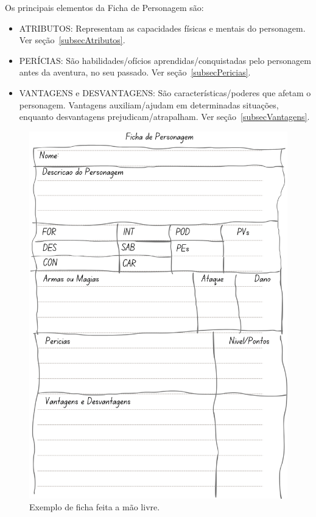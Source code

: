 Os principais elementos da Ficha de Personagem são: 
\begin{itemize}
	\item ATRIBUTOS: Representam as capacidades físicas e mentais do personagem. Ver seção~\ref{subsecAtributos}.
	\item PERÍCIAS: São habilidades/ofícios aprendidas/conquistadas pelo personagem antes da aventura, no seu passado. Ver seção~\ref{subsecPericias}.
	\item VANTAGENS e DESVANTAGENS: São características/poderes que afetam o personagem. Vantagens auxiliam/ajudam em determinadas situações, enquanto desvantagens prejudicam/atrapalham.  Ver seção~\ref{subsecVantagens}.
\end{itemize}

 
\begin{figure}[htb]
	\centering\smaller
	\includegraphics[scale=0.9]{img/fichaManual2.png}
	\caption{Exemplo de ficha feita a mão livre.}
	\label{fichaMaoLivre}
\end{figure}



